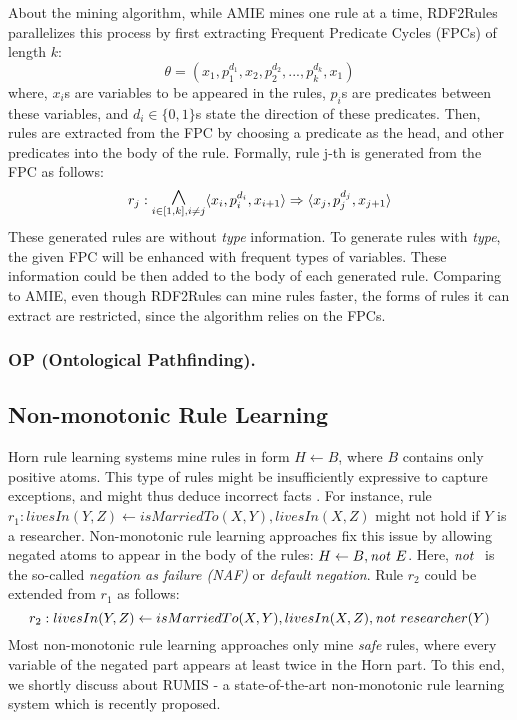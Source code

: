 About the mining algorithm, while AMIE mines one rule at a time, RDF2Rules parallelizes this process by first extracting Frequent Predicate Cycles (FPCs) of length $k$:
\[\theta = (x_1, p_1^{d_1}, x_2, p_2^{d_2}, ..., p_k^{d_k}, x_1)\]
where, $x_i$s are variables to be appeared in the rules, $p_i$s are predicates between these variables, and $d_i \in \{0,1\}$s state the direction of these predicates. Then, rules are extracted from the FPC by choosing a predicate as the head, and other predicates into the body of the rule. Formally, rule j-th is generated from the FPC as follows:
\[r_j: \underset{i \in [1,k], i \ne j}{\mathlarger{\mathlarger{\mathlarger{\wedge}}}} \tuple{x_i,p_i^{d_i},x_{i+1}} \Rightarrow \tuple{x_j,p_j^{d_j},x_{j+1}}\]
These generated rules are without \textit{type} information. To generate rules with \textit{type}, the given FPC will be enhanced with frequent types of variables. These information could be then added to the body of each generated rule. Comparing to AMIE, even though RDF2Rules can mine rules faster, the forms of rules it can extract are restricted, since the algorithm relies on the FPCs.

\subsubsection{OP (Ontological Pathfinding).}
\subsection{Non-monotonic Rule Learning}
Horn rule learning systems mine rules in form $H \leftarrow B$, where $B$ contains only positive atoms. This type of rules might be insufficiently expressive to capture
exceptions, and might thus deduce incorrect facts \cite{rumis}. For instance, rule $r_1 : livesIn(Y,Z) \leftarrow isMarriedTo(X,Y), livesIn(X,Z)$ might not hold if $Y$ is a researcher. Non-monotonic rule learning approaches \cite{gad2016,rumis} fix this issue by allowing negated atoms to appear in the body of the rules: $H \leftarrow B, \mathit{not}~ E$. Here, $\naf$ is the so-called \textit{negation as failure (NAF)} or \textit{default negation}. Rule $r_2$ could be extended from $r_1$ as follows:
\[r_2 : livesIn(Y,Z) \leftarrow isMarriedTo(X,Y), livesIn(X,Z), \mathit{not}~ researcher(Y)\]
Most non-monotonic rule learning approaches only mine \textit{safe} rules, where every variable of the negated part appears at least twice in the Horn part. To this end, we shortly discuss about RUMIS\cite{rumis} - a state-of-the-art non-monotonic rule learning system which is recently proposed.
